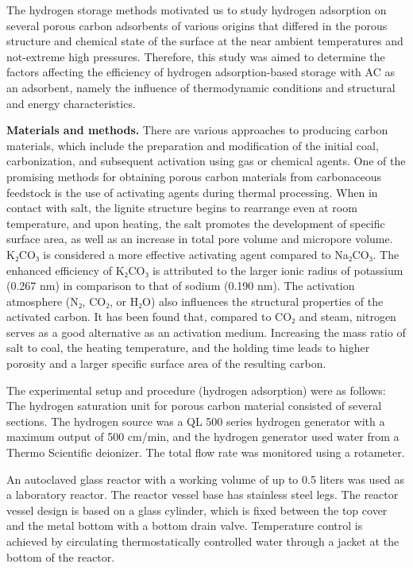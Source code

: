The hydrogen storage methods motivated us to study hydrogen adsorption
on several porous carbon adsorbents of various origins that differed in
the porous structure and chemical state of the surface at the near
ambient temperatures and not-extreme high pressures. Therefore, this
study was aimed to determine the factors affecting the efficiency of
hydrogen adsorption-based storage with AC as an adsorbent, namely the
influence of thermodynamic conditions and structural and energy
characteristics.

{\bfseries Materials and methods.} There are various approaches to
producing carbon materials, which include the preparation and
modification of the initial coal, carbonization, and subsequent
activation using gas or chemical agents. One of the promising methods
for obtaining porous carbon materials from carbonaceous feedstock is the
use of activating agents during thermal processing. When in contact with
salt, the lignite structure begins to rearrange even at room
temperature, and upon heating, the salt promotes the development of
specific surface area, as well as an increase in total pore volume and
micropore volume. K₂CO₃ is considered a more effective activating agent
compared to Na₂CO₃. The enhanced efficiency of K₂CO₃ is attributed to
the larger ionic radius of potassium (0.267 nm) in comparison to that of
sodium (0.190 nm). The activation atmosphere (N₂, CO₂, or H₂O) also
influences the structural properties of the activated carbon. It has
been found that, compared to CO₂ and steam, nitrogen serves as a good
alternative as an activation medium. Increasing the mass ratio of salt
to coal, the heating temperature, and the holding time leads to higher
porosity and a larger specific surface area of the resulting carbon.

The experimental setup and procedure (hydrogen adsorption) were as
follows: The hydrogen saturation unit for porous carbon material
consisted of several sections. The hydrogen source was a QL 500 series
hydrogen generator with a maximum output of 500
cm/min, and the hydrogen generator used water from a
Thermo Scientific deionizer. The total flow rate was monitored using a
rotameter.

An autoclaved glass reactor with a working volume of up to 0.5 liters
was used as a laboratory reactor. The reactor vessel base has stainless
steel legs. The reactor vessel design is based on a glass cylinder,
which is fixed between the top cover and the metal bottom with a bottom
drain valve. Temperature control is achieved by circulating
thermostatically controlled water through a jacket at the bottom of the
reactor.

